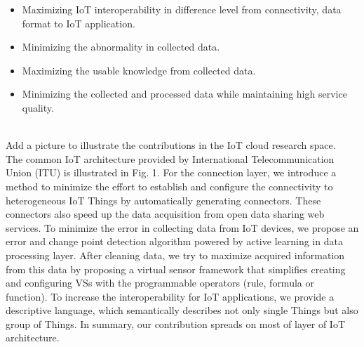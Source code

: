 \begin{itemize}
\item Maximizing IoT interoperability in difference level from connectivity, data format to IoT application.
\item Minimizing the abnormality in collected data. 
\item Maximizing the usable knowledge from collected data. 
\item Minimizing the collected and processed data while maintaining high service quality. 
\end{itemize}

\\
Add a picture to illustrate the contributions in the IoT cloud research space. 
\\

The common IoT architecture provided by International Telecommunication Union (ITU) is illustrated in Fig. 1. For the connection layer, we introduce a method to minimize the effort to establish and configure the connectivity to heterogeneous IoT Things by automatically generating connectors. These connectors also speed up the data acquisition from open data sharing web services. To minimize the error in collecting data from IoT devices, we propose an error and change point detection algorithm powered by active learning in data processing layer. After cleaning data, we try to maximize acquired information from this data by proposing a virtual sensor framework that simplifies creating and configuring VSs with the programmable operators (rule, formula or function). To increase the interoperability for IoT applications, we provide a descriptive language, which semantically describes not only single Things but also group of Things. In summary, our contribution spreads on most of layer of IoT architecture. 



